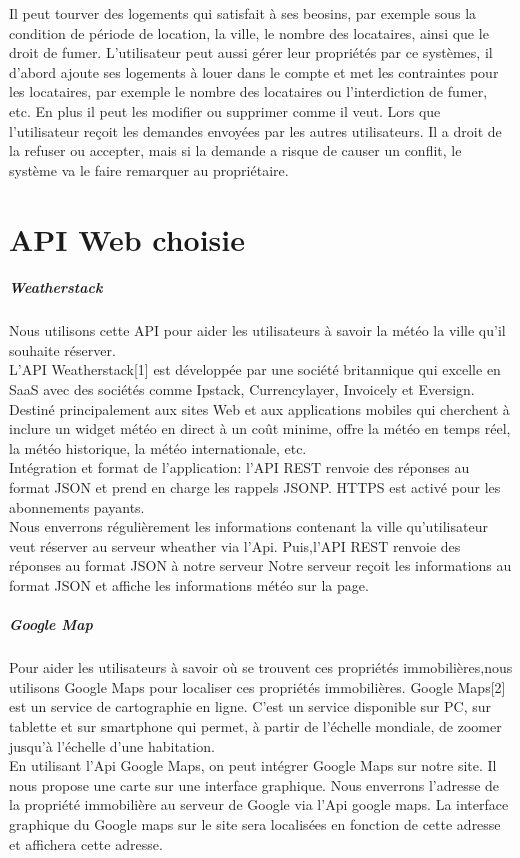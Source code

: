 \documentclass[14px]{article}
\begin{document}
Il peut tourver des logements qui satisfait à ses beosins, par exemple sous la condition de période de location, la ville, le nombre des locataires, ainsi que le droit de fumer.
L'utilisateur peut aussi gérer leur propriétés par ce systèmes, il d'abord ajoute ses logements à louer dans le compte et met les contraintes pour les locataires, par exemple le nombre des locataires ou l'interdiction de fumer, etc. En plus il peut les modifier ou supprimer comme il veut. Lors que l'utilisateur reçoit les demandes envoyées par les autres utilisateurs. Il a droit de la refuser ou accepter, mais si la demande a risque de causer un conflit, le système va le faire remarquer au propriétaire.


\section{API Web choisie}
\subparagraph{Weatherstack}
Nous utilisons cette API pour aider les utilisateurs à savoir la météo la ville qu'il souhaite réserver.\\
L'API Weatherstack[1] est développée par une société britannique qui excelle en SaaS avec des sociétés comme Ipstack, Currencylayer, Invoicely et Eversign. Destiné principalement aux sites Web et aux applications mobiles qui cherchent à inclure un widget météo en direct à un coût minime, offre la météo en temps réel, la météo historique, la météo internationale, etc.\\
Intégration et format de l'application: l'API REST renvoie des réponses au format JSON et prend en charge les rappels JSONP. HTTPS est activé pour les abonnements payants.\\
Nous enverrons régulièrement les informations contenant la ville qu'utilisateur veut réserver au serveur wheather via l'Api. Puis,l'API REST renvoie des réponses au format JSON à notre serveur Notre serveur reçoit les informations au format JSON et affiche les informations météo sur la page.
\subparagraph{Google Map}
Pour aider les utilisateurs à savoir où se trouvent ces propriétés immobilières,nous utilisons Google Maps pour localiser ces propriétés immobilières.
Google Maps[2] est un service de cartographie en ligne. C'est un service disponible sur PC, sur tablette et sur smartphone qui permet, à partir de l'échelle mondiale, de zoomer jusqu'à l'échelle d'une habitation.\\
En utilisant l'Api Google Maps, on peut intégrer Google Maps sur notre site. Il nous propose une carte sur une interface graphique. Nous enverrons l'adresse de la propriété immobilière au serveur de Google via l'Api google maps. La interface graphique du Google maps sur le site sera localisées en fonction de cette adresse et affichera cette adresse.
\end{document}
